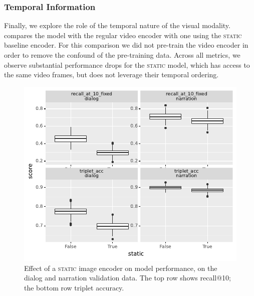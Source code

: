 \subsubsection{Temporal Information}
Finally, we explore the role of the temporal nature of the visual
modality.   compares the model with the regular video
encoder with one using the \textsc{static} baseline encoder.  For this
comparison we did not pre-train the video encoder in order to remove
the confound of the pre-training data.
Across
all metrics, we observe substantial performance drops for the
\textsc{static} model, which has access to the same video frames, but
does not leverage their temporal ordering. 
\begin{figure}[htb]
  \centering
  \includegraphics[width=\columnwidth]{results/ablations/static.pdf}
  \caption{Effect of a \textsc{static} image encoder on model performance, on 
  the dialog and narration validation data. The top row shows recall@10;
          the bottom row triplet accuracy.}
  \label{fig:static}
\end{figure}

